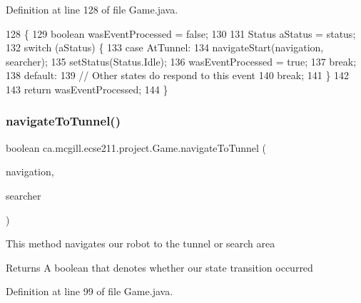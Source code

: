 Definition at line 128 of file Game.\+java.


\begin{DoxyCode}
128                                                                                \{
129     \textcolor{keywordtype}{boolean} wasEventProcessed = \textcolor{keyword}{false};
130 
131     Status aStatus = status;
132     \textcolor{keywordflow}{switch} (aStatus) \{
133       \textcolor{keywordflow}{case} AtTunnel:
134         navigateStart(navigation, searcher);
135         setStatus(Status.Idle);
136         wasEventProcessed = \textcolor{keyword}{true};
137         \textcolor{keywordflow}{break};
138       \textcolor{keywordflow}{default}:
139         \textcolor{comment}{// Other states do respond to this event}
140         \textcolor{keywordflow}{break};
141     \}
142 
143     \textcolor{keywordflow}{return} wasEventProcessed;
144   \}
\end{DoxyCode}
\mbox{\label{enumca_1_1mcgill_1_1ecse211_1_1project_1_1_game_ad3d03cffa33c927317d8fcba0c928a24}} 
\subsubsection{\texorpdfstring{navigate\+To\+Tunnel()}{navigateToTunnel()}}
{\footnotesize\ttfamily boolean ca.\+mcgill.\+ecse211.\+project.\+Game.\+navigate\+To\+Tunnel (\begin{DoxyParamCaption}\item[{\hyperlink{classca_1_1mcgill_1_1ecse211_1_1project_1_1_navigation}{Navigation}}]{navigation,  }\item[{\hyperlink{classca_1_1mcgill_1_1ecse211_1_1project_1_1_ring_searcher}{Ring\+Searcher}}]{searcher }\end{DoxyParamCaption})}

This method navigates our robot to the tunnel or search area

\begin{DoxyReturn}{Returns}
A boolean that denotes whether our state transition occurred 
\end{DoxyReturn}


Definition at line 99 of file Game.\+java.


